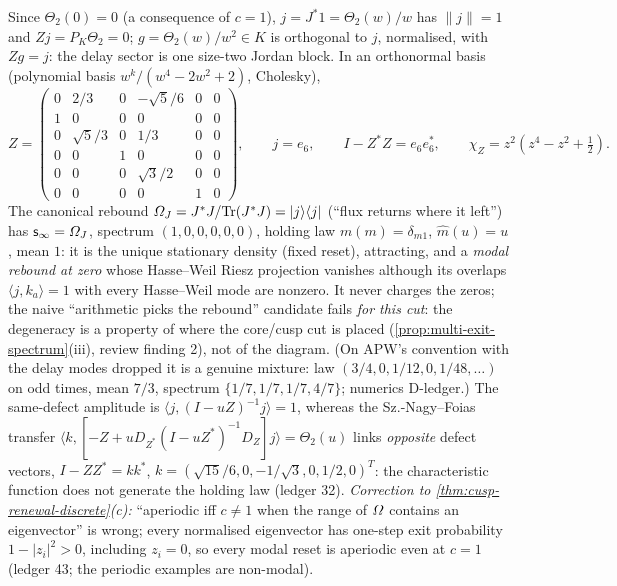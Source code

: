 \begin{proposition}
\label{prop:d2-canonical-rebound}
Since $\Theta_2(0) = 0$ (a consequence of $c = 1$), $j = J^{*}1 = \Theta_2(w)/w$ has $\|j\| = 1$ and $Zj = P_K\Theta_2 = 0$;
$g = \Theta_2(w)/w^2\in K$ is orthogonal to $j$, normalised, with $Zg = j$: the delay sector is one size-two Jordan
block. In an orthonormal basis (polynomial basis $w^k/(w^4-2w^2+2)$, Cholesky),
\[
Z = \begin{pmatrix}
0&2/3&0&-\sqrt5/6&0&0\\ 1&0&0&0&0&0\\ 0&\sqrt5/3&0&1/3&0&0\\ 0&0&1&0&0&0\\ 0&0&0&\sqrt3/2&0&0\\ 0&0&0&0&1&0
\end{pmatrix},\qquad j = e_6,\qquad I-Z^{*}Z = e_6e_6^{*},\qquad \chi_Z = z^2(z^4-z^2+\tfrac12).
\]
The canonical rebound $\varOmega_J = J^{*}J/\mathrm{Tr}(J^{*}J) = |j\rangle\langle j|$ (``flux returns where it left'') has
$\mathsf s_\infty = \varOmega_J$, spectrum $(1,0,0,0,0,0)$, holding law $m(m) = \delta_{m1}$, $\hat m(u) = u$, mean $1$: it is
the unique stationary density (fixed reset), attracting, and a \emph{modal rebound at zero} whose Hasse--Weil
Riesz projection vanishes although its overlaps $\langle j,k_a\rangle = 1$ with every Hasse--Weil mode are nonzero. It
never charges the zeros; the naive ``arithmetic picks the rebound'' candidate fails \emph{for this cut}: the degeneracy
is a property of where the core/cusp cut is placed (\cref{prop:multi-exit-spectrum}(iii), review finding 2), not of the
diagram. (On APW's convention with
the delay modes dropped it is a genuine mixture: law $(3/4,0,1/12,0,1/48,\dots)$ on odd times, mean $7/3$,
spectrum $\{1/7,1/7,1/7,4/7\}$; numerics D-ledger.) The same-defect amplitude is $\langle j,(I-uZ)^{-1}j\rangle = 1$,
whereas the Sz.-Nagy--Foias transfer $\langle k,[-Z+uD_{Z^{*}}(I-uZ^{*})^{-1}D_Z]j\rangle = \Theta_2(u)$ links
\emph{opposite} defect vectors, $I-ZZ^{*} = kk^{*}$, $k = (\sqrt{15}/6,0,-1/\sqrt3,0,1/2,0)^T$: the
characteristic function does not generate the holding law (ledger 32). \emph{Correction to
\cref{thm:cusp-renewal-discrete}(c):} ``aperiodic iff $c\ne1$ when the range of $\varOmega$ contains an eigenvector'' is
wrong; every normalised eigenvector has one-step exit probability $1-|z_i|^2>0$, including $z_i = 0$, so every
modal reset is aperiodic even at $c = 1$ (ledger 43; the periodic examples are non-modal).
\end{proposition}

